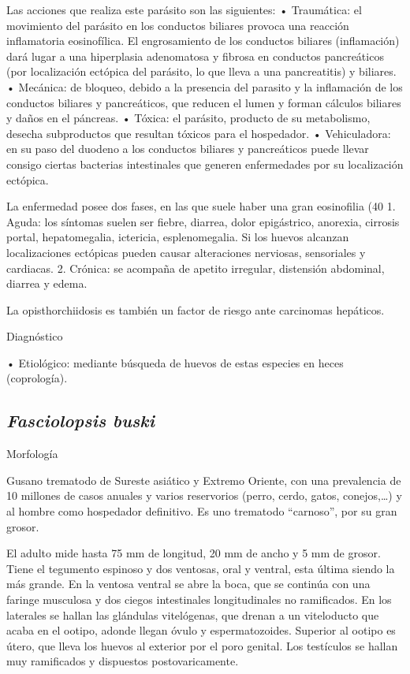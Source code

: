Las acciones que realiza este parásito son las siguientes:
• Traumática: el movimiento del parásito en los conductos biliares provoca una reacción inflamatoria eosinofílica. El engrosamiento de los conductos biliares (inflamación) dará lugar a una hiperplasia adenomatosa y fibrosa en conductos pancreáticos (por localización ectópica del parásito, lo que lleva a una pancreatitis) y biliares. 
• Mecánica: de bloqueo, debido a la presencia del parasito y la inflamación de los conductos biliares y pancreáticos, que reducen el lumen y forman cálculos biliares y daños en el páncreas. 
• Tóxica: el parásito, producto de su metabolismo, desecha subproductos que resultan tóxicos para el hospedador.
• Vehiculadora: en su paso del duodeno a los conductos biliares y pancreáticos puede llevar consigo ciertas bacterias intestinales que generen enfermedades por su localización ectópica.

La enfermedad posee dos fases, en las que suele haber una gran eosinofilia (40%
1. Aguda: los síntomas suelen ser fiebre, diarrea, dolor epigástrico, anorexia, cirrosis portal, hepatomegalia, ictericia, esplenomegalia. Si los huevos alcanzan localizaciones ectópicas pueden causar alteraciones nerviosas, sensoriales y cardiacas. 
2. Crónica: se acompaña de apetito irregular, distensión abdominal, diarrea y edema.

La opisthorchiidosis es también un factor de riesgo ante carcinomas hepáticos.

Diagnóstico

• Etiológico: mediante búsqueda de huevos de estas especies en heces (coprología).
\newpage
\subsection{\textit{Fasciolopsis buski}}
Morfología

Gusano trematodo de Sureste asiático y Extremo Oriente, con una prevalencia de 10 millones de casos anuales y varios reservorios (perro, cerdo, gatos, conejos,…) y al hombre como hospedador definitivo. Es uno trematodo “carnoso”, por su gran grosor.

El adulto mide hasta 75 mm de longitud, 20 mm de ancho y 5 mm de grosor. Tiene el tegumento espinoso y dos ventosas, oral y ventral, esta última siendo la más grande. En la ventosa ventral se abre la boca, que se continúa con una faringe musculosa y dos ciegos intestinales longitudinales no ramificados. En los laterales se hallan las glándulas vitelógenas, que drenan a un viteloducto que acaba en el ootipo, adonde llegan óvulo y espermatozoides. Superior al ootipo es útero, que lleva los huevos al exterior por el poro genital. Los testículos se hallan muy ramificados y dispuestos postovaricamente.

